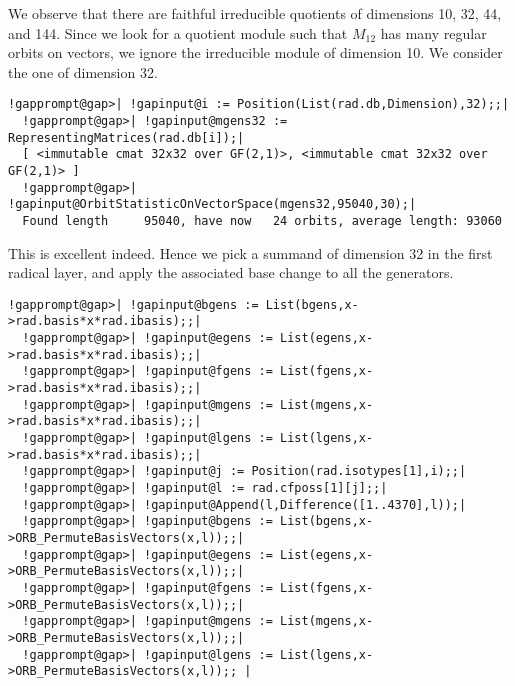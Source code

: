 \documentclass[a4paper,11pt]{report}
\begin{document}
{{ We observe that there are faithful irreducible quotients of dimensions 10, 32,
44, and 144. Since we look for a quotient module such that $M_{{12}}$ has many regular orbits on vectors, we ignore the irreducible module of
dimension 10. We consider the one of dimension 32. 
\begin{Verbatim}[commandchars=!@|,fontsize=\small,frame=single,label=Example]
  !gapprompt@gap>| !gapinput@i := Position(List(rad.db,Dimension),32);;|
  !gapprompt@gap>| !gapinput@mgens32 := RepresentingMatrices(rad.db[i]);|
  [ <immutable cmat 32x32 over GF(2,1)>, <immutable cmat 32x32 over GF(2,1)> ]
  !gapprompt@gap>| !gapinput@OrbitStatisticOnVectorSpace(mgens32,95040,30);|
  Found length     95040, have now   24 orbits, average length: 93060 
\end{Verbatim}
 This is excellent indeed. Hence we pick a summand of dimension 32 in the first
radical layer, and apply the associated base change to all the generators. 
\begin{Verbatim}[commandchars=!@|,fontsize=\small,frame=single,label=Example]
  !gapprompt@gap>| !gapinput@bgens := List(bgens,x->rad.basis*x*rad.ibasis);;|
  !gapprompt@gap>| !gapinput@egens := List(egens,x->rad.basis*x*rad.ibasis);;|
  !gapprompt@gap>| !gapinput@fgens := List(fgens,x->rad.basis*x*rad.ibasis);;|
  !gapprompt@gap>| !gapinput@mgens := List(mgens,x->rad.basis*x*rad.ibasis);;|
  !gapprompt@gap>| !gapinput@lgens := List(lgens,x->rad.basis*x*rad.ibasis);;|
  !gapprompt@gap>| !gapinput@j := Position(rad.isotypes[1],i);;|
  !gapprompt@gap>| !gapinput@l := rad.cfposs[1][j];;|
  !gapprompt@gap>| !gapinput@Append(l,Difference([1..4370],l));|
  !gapprompt@gap>| !gapinput@bgens := List(bgens,x->ORB_PermuteBasisVectors(x,l));;|
  !gapprompt@gap>| !gapinput@egens := List(egens,x->ORB_PermuteBasisVectors(x,l));;|
  !gapprompt@gap>| !gapinput@fgens := List(fgens,x->ORB_PermuteBasisVectors(x,l));;|
  !gapprompt@gap>| !gapinput@mgens := List(mgens,x->ORB_PermuteBasisVectors(x,l));;|
  !gapprompt@gap>| !gapinput@lgens := List(lgens,x->ORB_PermuteBasisVectors(x,l));; |
\end{Verbatim}
 

}}
\end{document}
